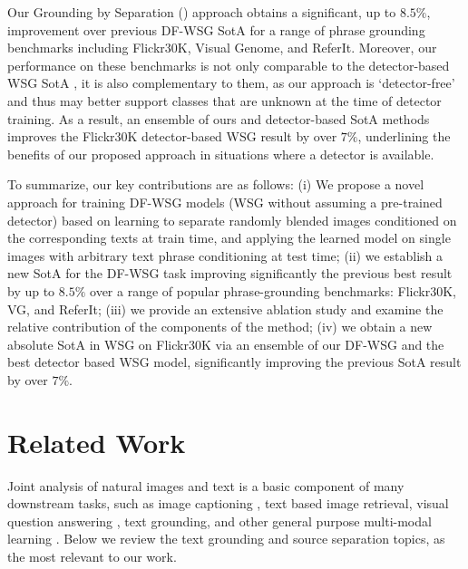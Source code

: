 \documentclass[10pt,twocolumn,letterpaper]{article}
\def\oursfull{Grounding by Separation }
\def\ourstask{DF-WSG}
\def\ourstaskspace{DF-WSG }
\newcommand\secvspace{\vspace{-0.0cm}}
\begin{document}
Our \oursfull{} (\ours) approach obtains a significant, up to $8.5\%$, improvement over previous \ourstask{} SotA \cite{akbari2019multi} for a range of phrase grounding benchmarks including Flickr30K, Visual Genome, and ReferIt. 
Moreover, our performance on these benchmarks is not only comparable to the detector-based WSG SotA \cite{datta2019align2ground,gupta2020contrastive,lu202012}, it is also complementary to them, as our approach is `detector-free' and thus may better support classes that are unknown at the time of detector training. As a result, an ensemble of ours and detector-based SotA methods \cite{gupta2020contrastive,lu202012} improves the Flickr30K detector-based WSG result by over $7\%$, underlining the benefits of our proposed \ours{} approach in situations where a detector is available.


To summarize, our key contributions are as follows: (i) We propose a novel \ours{} approach for training \ourstask{} models (WSG without assuming a pre-trained detector) based on learning to separate randomly blended images conditioned on the corresponding texts at train time, and applying the learned model on single images with arbitrary text phrase conditioning at test time; (ii) we establish a new SotA for the \ourstask{} task improving significantly the previous best result by up to $8.5\%$ over a range of popular phrase-grounding benchmarks: Flickr30K, VG, and ReferIt; (iii) we provide an extensive ablation study and examine the relative contribution of the components of the \ours{} method; (iv) we obtain a new absolute SotA in WSG on Flickr30K via an ensemble of our \ourstaskspace and the best detector based WSG model, significantly improving the previous SotA result by over $7\%$.
%
 \secvspace
\section{Related Work}
\secvspace
Joint analysis of natural images and text is a basic component of many downstream tasks, such as image captioning \cite{cornia2020meshed, karpathy2015deep, pan2020x, vinyals2016show, wang2016image, yao2017boosting, you2016image, zhou2020unified}, text based image retrieval\cite{chen2020uniter,lee2018stacked, lu2019vilbert,lu202012,wang2016learning,young2014image}, visual question answering \cite{alberti2019fusion, antol2015vqa, chen2020counterfactual, gokhale2020vqa, goyal2017making,xu2016ask}, text grounding\cite{akbari2019multi,chen2017msrc,chen2017query,datta2019align2ground,gupta2020contrastive,plummer2015flickr30k,wang2019phrase}, and other general purpose multi-modal learning \cite{huang2020pixel, li2020unicoder,li2019visualbert, li2020weakly,  radford2021learning,  su2019vl, sun2019videobert, tan2019lxmert}. Below we review the text grounding and source separation topics, as the most relevant to our work.
\end{document}
